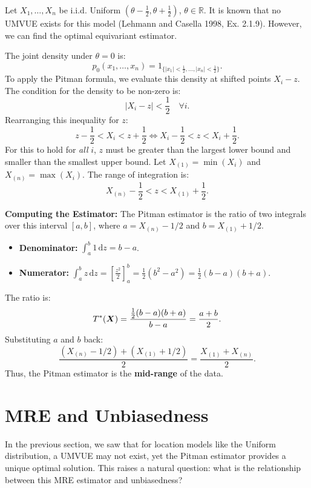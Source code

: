 \begin{ex}

\label{ex:uniform_pitman}

Let \(X_1, \dots, X_n\) be i.i.d. Uniform \((\theta - \frac{1}{2}, \theta + \frac{1}{2})\), \(\theta \in \mathbb{R}\).
It is known that no UMVUE exists for this model (Lehmann and Casella 1998, Ex. 2.1.9). However, we can find the optimal equivariant estimator.



The joint density under \(\theta = 0\) is:
\[
p_0(x_1,\ldots,x_n)=1_{\{|x_1|<\frac{1}{2},\ldots,|x_n|<\frac{1}{2}\}}.
\]
To apply the Pitman formula, we evaluate this density at shifted points \(X_i - z\). The condition for the density to be non-zero is:
\[
\left| X_i - z \right| < \frac{1}{2} \quad \forall i.
\]
Rearranging this inequality for \(z\):
\[
z - \frac{1}{2} < X_i < z + \frac{1}{2} \iff X_i - \frac{1}{2} < z < X_i + \frac{1}{2}.
\]
For this to hold for \emph{all} \(i\), \(z\) must be greater than the largest lower bound and smaller than the smallest upper bound. Let \(X_{(1)} = \min(X_i)\) and \(X_{(n)} = \max(X_i)\). The range of integration is:
\[
X_{(n)} - \frac{1}{2} < z < X_{(1)} + \frac{1}{2}.
\]

\textbf{Computing the Estimator:}
The Pitman estimator is the ratio of two integrals over this interval \([a, b]\), where \(a = X_{(n)} - 1/2\) and \(b = X_{(1)} + 1/2\).
\begin{itemize}
\item \textbf{Denominator:} \(\int_a^b 1 \, \mathrm{d}z = b - a\).
\item \textbf{Numerator:} \(\int_a^b z \, \mathrm{d}z = \left[ \frac{z^2}{2} \right]_a^b = \frac{1}{2}(b^2 - a^2) = \frac{1}{2}(b-a)(b+a)\).
\end{itemize}
The ratio is:
\[
T^*(\boldsymbol{X}) = \frac{\frac{1}{2}(b-a)(b+a)}{b-a} = \frac{a+b}{2}.
\]
Substituting \(a\) and \(b\) back:
\[
\frac{(X_{(n)} - 1/2) + (X_{(1)} + 1/2)}{2} = \frac{X_{(1)} + X_{(n)}}{2}.
\]
Thus, the Pitman estimator is the \textbf{mid-range} of the data.
\end{ex}

\section{MRE and Unbiasedness}
\label{sub:mre_unbiasedness}

In the previous section, we saw that for location models like the Uniform distribution, a UMVUE may not exist, yet the Pitman estimator provides a unique optimal solution. This raises a natural question: what is the relationship between this MRE estimator and unbiasedness?




